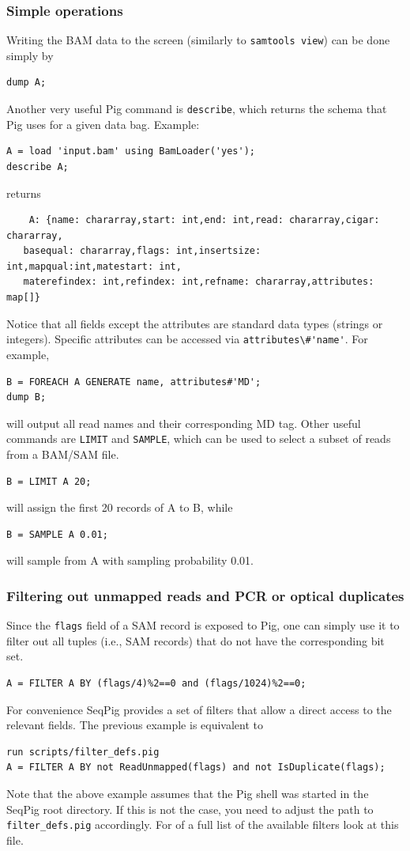 \subsubsection{Simple operations}

Writing the BAM data to the screen (similarly to {\tt samtools view})
can be done simply by
\begin{lstlisting}
dump A;
\end{lstlisting}
Another very useful Pig command is {\tt describe}, which returns the schema that Pig
uses for a given data bag. Example:
\begin{lstlisting}
A = load 'input.bam' using BamLoader('yes');
describe A;
\end{lstlisting}
returns
\begin{lstlisting}  
	A: {name: chararray,start: int,end: int,read: chararray,cigar: chararray,
   basequal: chararray,flags: int,insertsize: int,mapqual:int,matestart: int,
   materefindex: int,refindex: int,refname: chararray,attributes: map[]}
\end{lstlisting}
Notice that all fields except the attributes are standard data types (strings
or integers). Specific attributes can be accessed via \verb|attributes\#'name'|. For
example,
\begin{lstlisting} 
B = FOREACH A GENERATE name, attributes#'MD';
dump B;
\end{lstlisting}
will output all read names and their corresponding MD tag.
Other useful commands are {\tt LIMIT} and {\tt SAMPLE}, which can be used to
select a subset of reads from a BAM/SAM file.
\begin{lstlisting} 
B = LIMIT A 20;
\end{lstlisting}
will assign the first 20 records of A to B, while
\begin{lstlisting}
B = SAMPLE A 0.01;
\end{lstlisting}
will sample from A with sampling probability 0.01.

\subsubsection{Filtering out unmapped reads and PCR or optical duplicates}
Since the {\tt flags} field of a SAM record is exposed to Pig, one can simply
use it to filter out all tuples (i.e., SAM records) that do not have the
corresponding bit set.
\begin{lstlisting}
A = FILTER A BY (flags/4)%2==0 and (flags/1024)%2==0;
\end{lstlisting}
For convenience SeqPig provides a set of filters that allow a direct access
to the relevant fields. The previous example is equivalent to
\begin{lstlisting}
run scripts/filter_defs.pig
A = FILTER A BY not ReadUnmapped(flags) and not IsDuplicate(flags);
\end{lstlisting}
Note that the above example assumes that the Pig shell was started in
the SeqPig root directory. If this is not the case, you need to adjust
the path to {\tt filter\_defs.pig} accordingly. For of a full list of
the available filters look at this file.

